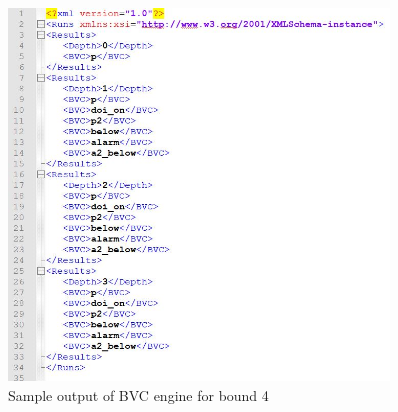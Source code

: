 \begin{figure}
  \centering
  \includegraphics[width=0.9\textwidth]{figs/bvcout.jpg}
  \caption{Sample output of BVC engine for bound 4}
  \label{fig:bvcout}
\end{figure}








